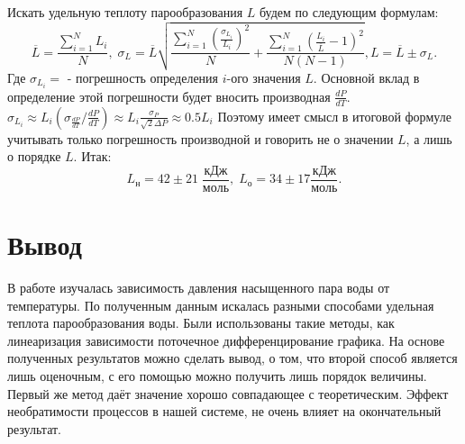 \documentclass[a4paper,12pt]{article}
\begin{document}
\begin{enumerate}
\begin{center}
\begin{table}
	\caption{$\ln{\frac{P_н}{P_0}} = (19.5 \pm 0.5) - (4860 \pm 160) \cdot \frac{1}{T}, \; ln{\frac{P_о}{P_0}} =(19.5 \pm 0.4) - (4840\pm 110) \cdot \frac{1}{T}$}
\end{table}
\end{center}

Искать удельную теплоту парообразования $L$ будем по следующим формулам: 
$$\overline{L} = \frac{\sum_{i=1}^{N} L_{i}}{N},\; \sigma_L = \overline{L} \sqrt{\frac{\sum_{i=1}^{N} (\frac{\sigma_{L_{i}}}{L_i})^2}{N} + \frac{\sum_{i=1}^{N} (\frac {L_{i}}{\overline{L}}-1)^2}{N(N-1)}}, L = \overline{L} \pm \sigma_L.$$ Где $\sigma_{L_i} = $ - погрешность определения $i$-ого значения $L$. Основной вклад в определение этой погрешности будет вносить производная $\frac{dP}{dT}$. $\sigma_{L_i} \approx L_i (\sigma_{\frac{dP}{dT}}/\frac{dP}{dT}) \approx L_i \frac{\sigma_P}{\sqrt{2}\Delta P} \approx 0.5 L_i $ 
Поэтому имеет смысл в итоговой формуле учитывать только погрешность производной и говорить не о значении $L$, а лишь о порядке $L$. Итак: $$L_н = 42 \pm 21 \; \frac{кДж}{моль}, \; L_о = 34 \pm 17 \frac{кДж}{моль}.$$

\section{Вывод}
В работе изучалась зависимость давления насыщенного пара воды от температуры. По полученным данным искалась разными способами удельная теплота парообразования воды. Были использованы такие методы, как линеаризация зависимости поточечное дифференцирование графика. На основе полученных результатов можно сделать вывод, о том, что второй способ является лишь оценочным, с его помощью можно получить лишь порядок величины. Первый же метод даёт значение хорошо совпадающее с теоретическим. Эффект необратимости процессов в нашей системе, не очень влияет на окончательный результат.
\end{enumerate}
\end{document}
